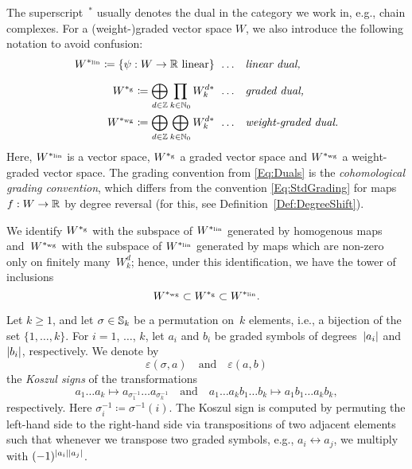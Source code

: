 \documentclass[\MainFolder/Text.tex]{subfiles}
\begin{document}
\begin{Definition}
The superscript $\,{}^*$ usually denotes the dual in the category we work in, e.g., chain complexes. For a (weight-)graded vector space $W$, we also introduce the following notation to avoid confusion:%
\begin{equation}\label{Eq:Duals}\begin{aligned}
W^{*_{\mathrm{lin}}} \coloneqq \{\psi: W \rightarrow \mathbb{R} \text{ linear}\} &\;\,\dots&& \text{\emph{linear dual,}}\\[2\jot]
W^{*_{\mathrm{g}}}  \coloneqq \bigoplus_{d\in  \mathbb{Z}} \prod_{k\in \mathbb{N}_0} W_{k}^{d*} &\;\,\dots&& \text{\emph{graded dual,}}\\
W^{*_{\mathrm{wg}}} \coloneqq \bigoplus_{d\in \mathbb{Z}} \bigoplus_{k\in \mathbb{N}_0} W_k^{d*} &\;\,\dots&& \text{\emph{weight-graded dual.}}
\end{aligned}
\end{equation}
Here, $W^{*_{\mathrm{lin}}}$ is a vector space, $W^{*_{\mathrm{g}}}$ a graded vector space and $W^{*_{\mathrm{wg}}}$ a weight-graded vector space. The grading convention from \eqref{Eq:Duals} is the \emph{cohomological grading convention}, which differs from the convention \eqref{Eq:StdGrading} for maps $f: W \rightarrow \mathbb{R}$ by degree reversal (for this, see Definition~\ref{Def:DegreeShift}).

We identify $W^{*_{\mathrm{g}}}$ with the subspace of $W^{*_{\mathrm{lin}}}$ generated by homogenous maps and~$W^{*_{\mathrm{wg}}}$ with the subspace of $W^{*_{\mathrm{lin}}}$ generated by maps which are non-zero only on finitely many~$W_k^d$; hence, under this identification, we have the tower of inclusions 
\[ W^{*_{\mathrm{wg}}} \subset W^{*_{\mathrm{g}}} \subset W^{*_{\mathrm{lin}}}.\]
\end{Definition}


\begin{Definition} \label{Def:Koszul}
Let $k\ge 1$, and let $\sigma\in \mathbb{S}_k$ be a permutation on~$k$ elements, i.e., a bijection of the set $\{1,\dotsc,k\}$. For $i=1$, $\dotsc$, $k$,  let $a_i$ and $b_i$ be graded symbols of degrees~$|a_i|$ and~$|b_i|$, respectively. We denote by 
\[\varepsilon(\sigma,a) \quad\text{and}\quad\varepsilon(a,b)\]
the \emph{Koszul signs} of the transformations
 \[ a_1 \dots a_k \longmapsto a_{\sigma_1^{-1}} \dots a_{\sigma_k^{-1}} \quad \text{and} \quad a_1 \dots a_k b_1 \dots b_k \longmapsto a_1 b_1 \dots a_k b_k, \]
respectively. Here $\sigma_i^{-1} \coloneqq \sigma^{-1}(i)$. The Koszul sign is computed by permuting the left-hand side to the right-hand side via transpositions of two adjacent elements such that whenever we transpose two graded symbols, e.g., $a_i \longleftrightarrow a_{j}$, we multiply with $(-1)^{|a_i||a_{j}|}$.
\end{Definition}
\end{document}
